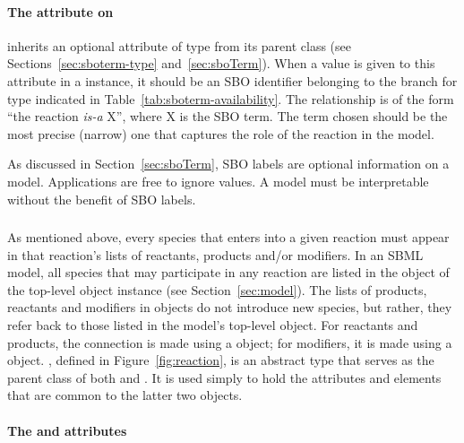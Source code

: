 \paragraph{The  attribute on }
\label{sec:reaction-sboterm}

\Reaction inherits an optional 
attribute of type  from its parent
class \SBase (see Sections~\ref{sec:sboterm-type}
and~\ref{sec:sboTerm}).  When a value is given to this
attribute in a  \Reaction instance, it should be an
SBO identifier belonging to the branch for type  \Reaction  
indicated in Table~\ref{tab:sboterm-availability}.  The relationship is
of the form ``the reaction \emph{is-a} X'', where X is
the SBO term.  The term chosen should be the most precise (narrow)
one that captures the role of the reaction in the model.

As discussed in Section~\ref{sec:sboTerm}, SBO labels are optional
information on a model.  Applications are free to ignore
 values.  A model must be interpretable without the
benefit of SBO labels.


\subsubsection{}
\label{subsec:simplespeciesreference}

As mentioned above, every species that enters into a given
reaction must appear in that reaction's lists of reactants,
products and/or modifiers.  In an SBML model, all species that may
participate in any reaction are listed in the \ListOfSpecies
object of the top-level \Model object instance (see
Section~\ref{sec:model}).  The lists of products, reactants and
modifiers in \Reaction objects do not introduce new species, but
rather, they refer back to those listed in the model's top-level
\ListOfSpecies object.  For reactants and products, the connection
is made using a \SpeciesReference object; for modifiers, it is
made using a \ModifierSpeciesReference object.
\SimpleSpeciesReference, defined in Figure~\vref{fig:reaction}, is
an abstract type that serves as the parent class of both
\SpeciesReference and \ModifierSpeciesReference.  It is used
simply to hold the attributes and elements that are common to the
latter two objects.


\paragraph{The  and  attributes}

